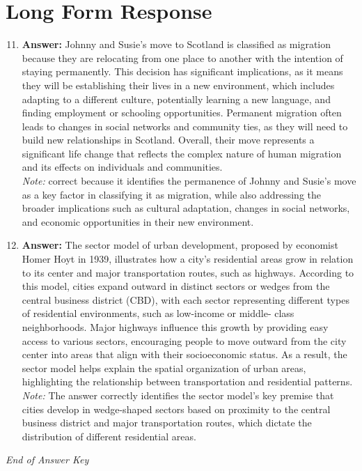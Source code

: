 \documentclass[12pt]{article}
\begin{document}
\section*{Long Form Response}
\begin{enumerate}[label=\arabic*.]
\setcounter{enumi}{10}
\item \textbf{Answer:} Johnny and Susie's move to Scotland is classified as migration because they are relocating from one place to another with the intention of staying permanently. This decision has significant implications, as it means they will be establishing their lives in a new environment, which includes adapting to a different culture, potentially learning a new language, and finding employment or schooling opportunities. Permanent migration often leads to changes in social networks and community ties, as they will need to build new relationships in Scotland. Overall, their move represents a significant life change that reflects the complex nature of human migration and its effects on individuals and communities.
\\ \textit{Note:} correct because it identifies the permanence of Johnny and Susie's move as a key factor in classifying it as migration, while also addressing the broader implications such as cultural adaptation, changes in social networks, and economic opportunities in their new environment.
\item \textbf{Answer:} The sector model of urban development, proposed by economist Homer Hoyt in 1939, illustrates how a city's residential areas grow in relation to its center and major transportation routes, such as highways. According to this model, cities expand outward in distinct sectors or wedges from the central business district (CBD), with each sector representing different types of residential environments, such as low-income or middle- class neighborhoods. Major highways influence this growth by providing easy access to various sectors, encouraging people to move outward from the city center into areas that align with their socioeconomic status. As a result, the sector model helps explain the spatial organization of urban areas, highlighting the relationship between transportation and residential patterns.
\\ \textit{Note:} The answer correctly identifies the sector model's key premise that cities develop in wedge-shaped sectors based on proximity to the central business district and major transportation routes, which dictate the distribution of different residential areas.
\end{enumerate}

\vfill
\noindent\textit{End of Answer Key}
\end{document}
